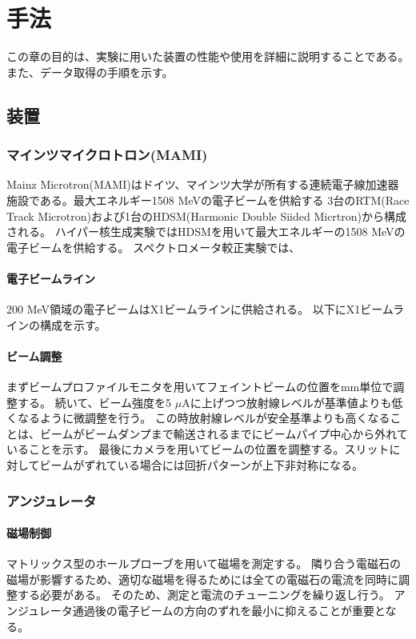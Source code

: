 \documentclass[a4paper,11pt,uplatex]{jsbook}
\begin{document}
\chapter{手法}
この章の目的は、実験に用いた装置の性能や使用を詳細に説明することである。
また、データ取得の手順を示す。
\section{装置}
\subsection{マインツマイクロトロン(MAMI)}
Mainz Microtron(MAMI)はドイツ、マインツ大学が所有する連続電子線加速器施設である。最大エネルギー1508 MeVの電子ビームを供給する
3台のRTM(Race Track Microtron)および1台のHDSM(Harmonic Double Siided Micrtron)から構成される。
ハイパー核生成実験ではHDSMを用いて最大エネルギーの1508 MeVの電子ビームを供給する。
スペクトロメータ較正実験では、

\subsubsection{電子ビームライン}
200 MeV領域の電子ビームはX1ビームラインに供給される。
以下にX1ビームラインの構成を示す。

\subsubsection{ビーム調整}
まずビームプロファイルモニタを用いてフェイントビームの位置をmm単位で調整する。
続いて、ビーム強度を5 $\mu\text{A}$に上げつつ放射線レベルが基準値よりも低くなるように微調整を行う。
この時放射線レベルが安全基準よりも高くなることは、ビームがビームダンプまで輸送されるまでにビームパイプ中心から外れていることを示す。
最後にカメラを用いてビームの位置を調整する。スリットに対してビームがずれている場合には回折パターンが上下非対称になる。

\subsection{アンジュレータ}
\subsubsection{磁場制御}
マトリックス型のホールプローブを用いて磁場を測定する。
隣り合う電磁石の磁場が影響するため、適切な磁場を得るためには全ての電磁石の電流を同時に調整する必要がある。
そのため、測定と電流のチューニングを繰り返し行う。
アンジュレータ通過後の電子ビームの方向のずれを最小に抑えることが重要となる。
\end{document}
